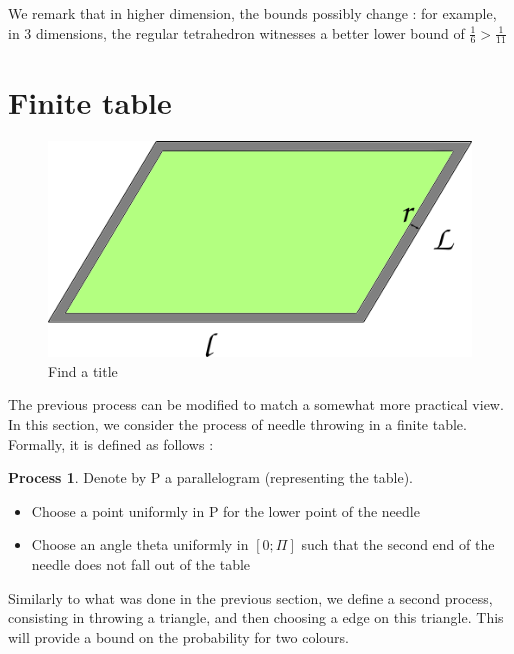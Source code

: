 \documentclass[a4paper,11pt]{article}
\theoremstyle{definition}
\newtheorem{process}{Process}
\theoremstyle{remark}
\begin{document}
We remark that in higher dimension, the bounds possibly change : for
example, in 3 dimensions, the regular tetrahedron witnesses a better lower bound
of $\frac 1 6 >\frac 1 {11}$   

\section{Finite table}

\begin{figure}[h]
\center
\includegraphics[scale=0.5]{tablefinie.png}
\caption{\label{tablefinie} Find a title}
\end{figure}
The previous process can be modified to match a somewhat more practical view. In this section, we consider the process of needle throwing in a finite table. 
Formally, it is defined as follows :
\begin{process}
Denote by P a parallelogram (representing the table). 
\begin{itemize}
\item Choose a point uniformly in P for the lower point of the needle
\item Choose an angle theta uniformly in $[0 ; \Pi]$ such that the second end of the needle does not fall out of the table
\end{itemize}
\end{process}

Similarly to what was done in the previous section, we define a second process, consisting in throwing a triangle, and then choosing a edge on this triangle.
This will provide a bound on the probability for two colours.
\end{document}
